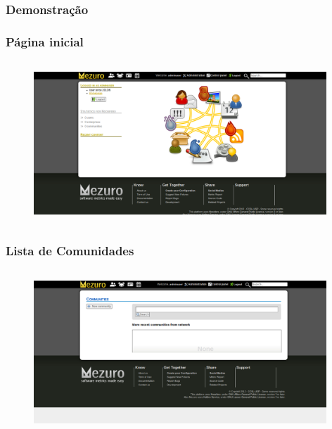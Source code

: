 \documentclass{beamer}
\begin{document}
  \subsubsection{Demonstração}
  
    \begin{frame}
      \frametitle{Página inicial}
      \framesubtitle{}
      
      \begin{figure}
        \begin{center}
          \includegraphics[width=11cm, height=6cm]{images/00-home.png}
          \label{fig:home}
        \end{center}
      \end{figure}
    
    \end{frame}
    
    \begin{frame}
      \frametitle{Lista de Comunidades}
      \framesubtitle{}
    
      \begin{figure}
        \begin{center}
          \includegraphics[width=11cm, height=6cm]{images/01-community-list.png}
          \label{fig:}
        \end{center}
      \end{figure}
    \end{frame}
    
\end{document}

